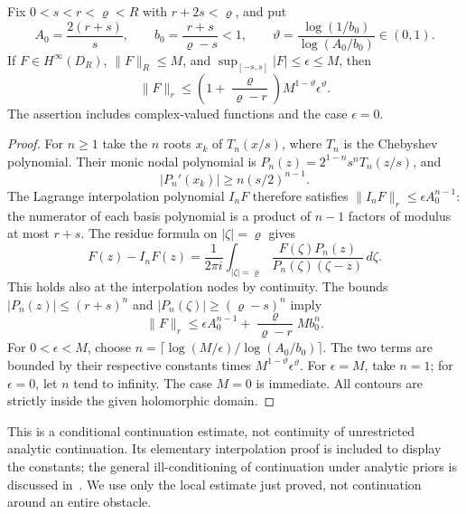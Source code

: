 \begin{lemma}
\label{lem:v60-real-to-disc}
Fix $0<s<r<\varrho<R$ with $r+2s<\varrho$, and put
\begin{equation}\label{eq:v60-propagation-constants}
 A_0=\frac{2(r+s)}s,
 \qquad b_0=\frac{r+s}{\varrho-s}<1,
 \qquad \vartheta=\frac{\log(1/b_0)}{\log(A_0/b_0)}\in(0,1).
\end{equation}
If $F\in H^\infty(D_R)$, $\|F\|_R\le M$, and
$\sup_{[-s,s]}|F|\le\epsilon\le M$, then
\begin{equation}\label{eq:v60-propagation}
 \|F\|_r\le
 \left(1+\frac{\varrho}{\varrho-r}\right)
                  M^{1-\vartheta}\epsilon^{\vartheta}.
\end{equation}
The assertion includes complex-valued functions and the case
$\epsilon=0$.
\end{lemma}

\begin{proof}
For $n\ge1$ take the $n$ roots $x_k$ of $T_n(x/s)$, where $T_n$ is
the Chebyshev polynomial.  Their monic nodal polynomial is
$P_n(z)=2^{1-n}s^nT_n(z/s)$, and
\[
 |P_n'(x_k)|\ge n(s/2)^{n-1}.
\]
The Lagrange interpolation polynomial $I_nF$ therefore satisfies
$\|I_nF\|_r\le\epsilon A_0^{n-1}$: the numerator of each basis
polynomial is a product of $n-1$ factors of modulus at most $r+s$.
The residue formula on $|\zeta|=\varrho$ gives
\[
 F(z)-I_nF(z)=\frac1{2\pi i}
   \int_{|\zeta|=\varrho}
       \frac{F(\zeta)P_n(z)}{P_n(\zeta)(\zeta-z)}\,d\zeta.
\]
This holds also at the interpolation nodes by continuity.  The bounds
$|P_n(z)|\le(r+s)^n$ and
$|P_n(\zeta)|\ge(\varrho-s)^n$ imply
\begin{equation}\label{eq:v60-interpolation-balance}
 \|F\|_r\le \epsilon A_0^{n-1}
           +\frac{\varrho}{\varrho-r}M b_0^n.
\end{equation}
For $0<\epsilon<M$, choose
$n=\lceil\log(M/\epsilon)/\log(A_0/b_0)\rceil$.
The two terms are bounded by their respective constants times
$M^{1-\vartheta}\epsilon^\vartheta$.  For $\epsilon=M$, take
$n=1$; for $\epsilon=0$, let $n$ tend to infinity.
The case $M=0$ is immediate.  All contours are strictly inside the
given holomorphic domain.
\end{proof}

This is a conditional continuation estimate, not continuity of
unrestricted analytic continuation.  Its elementary interpolation
proof is included to display the constants; the general ill-conditioning
of continuation under analytic priors is discussed in~\cite{Trefethen2020}.
We use only the local estimate just proved, not continuation around an
entire obstacle.

